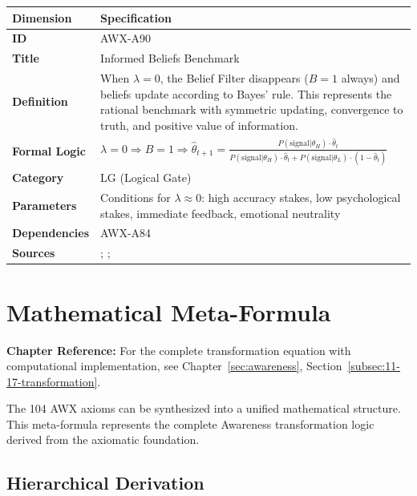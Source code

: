 \begin{table}[htbp]
\small
\begin{tabular}{p{3cm}p{11cm}}
\toprule
\textbf{Dimension} & \textbf{Specification} \\
\midrule
\textbf{ID} & AWX-A90 \\
\textbf{Title} & Informed Beliefs Benchmark \\
\textbf{Definition} & When $\lambda = 0$, the Belief Filter disappears ($B = 1$ always) and beliefs update according to Bayes' rule. This represents the rational benchmark with symmetric updating, convergence to truth, and positive value of information. \\
\textbf{Formal Logic} & $\lambda = 0 \Rightarrow B = 1 \Rightarrow \hat{\theta}_{t+1} = \frac{P(\text{signal}|\theta_H) \cdot \hat{\theta}_t}{P(\text{signal}|\theta_H) \cdot \hat{\theta}_t + P(\text{signal}|\theta_L) \cdot (1-\hat{\theta}_t)}$ \\
\textbf{Category} & LG (Logical Gate) \\
\textbf{Parameters} & Conditions for $\lambda \approx 0$: high accuracy stakes, low psychological stakes, immediate feedback, emotional neutrality \\
\textbf{Dependencies} & AWX-A84 \\
\textbf{Sources} & \citet{benabou2015economics}; \citet{mobius2022managing}; \citet{eil2011good} \\
\bottomrule
\end{tabular}
\end{table}

\section{Mathematical Meta-Formula}


\begin{cross-reference}
\textbf{Chapter Reference:} For the complete transformation equation with 
computational implementation, see Chapter~\ref{sec:awareness}, 
Section~\ref{subsec:11-17-transformation}.
\end{cross-reference}
The 104 AWX axioms can be synthesized into a unified mathematical structure. This meta-formula represents the complete Awareness transformation logic derived from the axiomatic foundation.

\subsection{Hierarchical Derivation}

